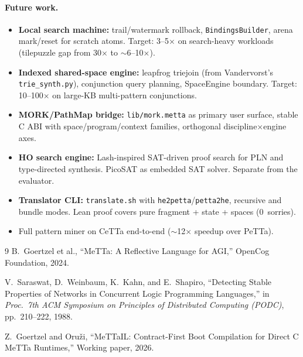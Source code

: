 \documentclass[11pt]{article}
\newcommand{\code}[1]{\texttt{#1}}
\newcommand{\PeTTa}{\textup{PeTTa}}
\newcommand{\CeTTa}{\textup{CeTTa}}
\begin{document}
\paragraph{Future work.}
\begin{itemize}
\item \textbf{Local search machine:} trail/watermark rollback,
  \code{BindingsBuilder}, arena mark/reset for scratch atoms.
  Target: 3--5$\times$ on search-heavy workloads (tilepuzzle gap
  from 30$\times$ to $\sim$6--10$\times$).
\item \textbf{Indexed shared-space engine:} leapfrog triejoin
  (from Vandervorst's \code{trie\_synth.py}), conjunction query
  planning, SpaceEngine boundary.  Target: 10--100$\times$ on
  large-KB multi-pattern conjunctions.
\item \textbf{MORK/PathMap bridge:} \code{lib/mork.metta} as
  primary user surface, stable C ABI with space/program/context
  families, orthogonal discipline$\times$engine axes.
\item \textbf{HO search engine:} Lash-inspired SAT-driven proof
  search for PLN and type-directed synthesis.  PicoSAT as
  embedded SAT solver.  Separate from the evaluator.
\item \textbf{Translator CLI:} \code{translate.sh} with
  \code{he2petta}/\code{petta2he}, recursive and bundle modes.
  Lean proof covers pure fragment + state + spaces (0~sorries).
\item Full pattern miner on \CeTTa{} end-to-end
  ($\sim$12$\times$ speedup over \PeTTa{}).
\end{itemize}

\begin{thebibliography}{9}
  B.~Goertzel et al.,
  ``MeTTa: A Reflective Language for AGI,''
  OpenCog Foundation, 2024.

  V.~Saraswat, D.~Weinbaum, K.~Kahn, and E.~Shapiro,
  ``Detecting Stable Properties of Networks in Concurrent Logic
  Programming Languages,''
  in \emph{Proc.\ 7th ACM Symposium on Principles of Distributed
  Computing (PODC)}, pp.~210--222, 1988.

  Z.~Goertzel and Oru\v{z}i,
  ``MeTTaIL: Contract-First Boot Compilation for Direct C MeTTa Runtimes,''
  Working paper, 2026.
\end{thebibliography}
\end{document}
